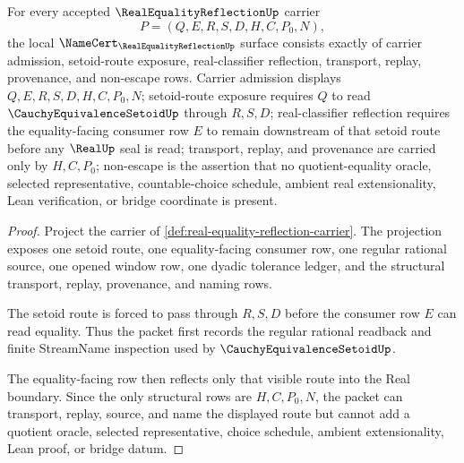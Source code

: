 \begin{theorem}
\label{thm:real-equality-reflection-namecert-obligation-surface}
For every accepted $\RealEqualityReflectionUp$ carrier
$$
P=(Q,E,R,S,D,H,C,P_0,N),
$$
the local $\NameCert_{\RealEqualityReflectionUp}$ surface consists exactly of carrier admission, setoid-route exposure, real-classifier reflection, transport, replay, provenance, and non-escape rows. Carrier admission displays $Q,E,R,S,D,H,C,P_0,N$; setoid-route exposure requires $Q$ to read $\CauchyEquivalenceSetoidUp$ through $R,S,D$; real-classifier reflection requires the equality-facing consumer row $E$ to remain downstream of that setoid route before any $\RealUp$ seal is read; transport, replay, and provenance are carried only by $H,C,P_0$; non-escape is the assertion that no quotient-equality oracle, selected representative, countable-choice schedule, ambient real extensionality, Lean verification, or bridge coordinate is present.
\end{theorem}
\begin{proof}
Project the carrier of \autoref{def:real-equality-reflection-carrier}. The projection exposes one setoid route, one equality-facing consumer row, one regular rational source, one opened window row, one dyadic tolerance ledger, and the structural transport, replay, provenance, and naming rows.

The setoid route is forced to pass through $R,S,D$ before the consumer row $E$ can read equality. Thus the packet first records the regular rational readback and finite StreamName inspection used by $\CauchyEquivalenceSetoidUp$.

The equality-facing row then reflects only that visible route into the Real boundary. Since the only structural rows are $H,C,P_0,N$, the packet can transport, replay, source, and name the displayed route but cannot add a quotient oracle, selected representative, choice schedule, ambient extensionality, Lean proof, or bridge datum.
\end{proof}

